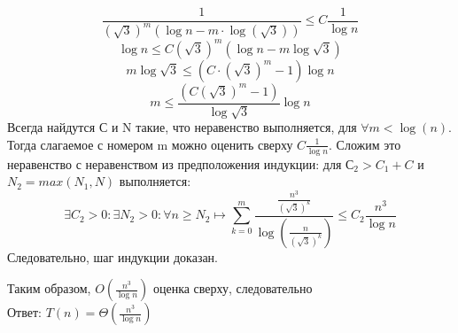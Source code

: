 \documentclass[a4paper,12pt]{article} %
\begin{document}
\[
\frac{1}{(\sqrt{3})^{m}(\log n-m \cdot \log (\sqrt{3}))} \leq C \frac{1}{\log n}
\]
\[
\log n \leq C(\sqrt{3})^{m}(\log n-m \log \sqrt{3})
\]
\[
m \log \sqrt{3} \leq\left(C \cdot(\sqrt{3})^{m}-1\right) \log n
\]
\[
m \leq \frac{\left(C(\sqrt{3})^{m}-1\right)}{\log \sqrt{3}} \log n
\]
Всегда найдутся С и N такие, что неравенство выполняется, для $\forall m < \log(n) $. Тогда слагаемое с номером m можно оценить сверху $C \frac{1}{\log n}$.
Сложим это неравенство с неравенством из предположения индукции: для  $С_2 > C_1 + C$ и $N_2 = max(N_1, N)$ выполняется:
\[\exists C_2>0: \exists N_2>0: \forall n \geq N_2 \mapsto \sum_{k=0}^{m} \frac{\frac{n^{3}}{(\sqrt{3})^{k}}}{\log \left(\frac{n}{(\sqrt{3})^k}\right)} \leq C_2 \frac{n^{3}}{\log n}\]
Следовательно, шаг индукции доказан.

Таким образом, $O(\frac{n^3}{\log n})$ оценка сверху, следовательно\\ 
Ответ: $T(n) = \Theta\left(\frac{n^3}{\log n}\right)$
\end{document}
